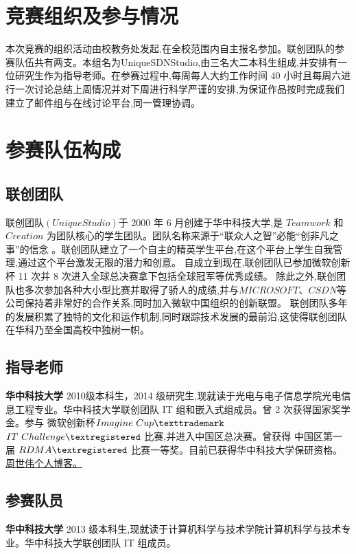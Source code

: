 \documentclass[format=draft,language=chinese,category=SDN]{hustreport}
\begin{document}
\section{竞赛组织及参与情况}
本次竞赛的组织活动由校教务处发起,在全校范围内自主报名参加。联创团队的参赛队伍共有两支。本组名为UniqueSDNStudio,由三名大二本科生组成,并安排有一位研究生作为指导老师。在参赛过程中,每周每人大约工作时间 40 小时且每周六进行一次讨论总结上周情况并对下周进行科学严谨的安排,为保证作品按时完成我们建立了邮件组与在线讨论平台,同一管理协调。
\section{参赛队伍构成}
\subsection{联创团队}
联创团队$(Unique Studio)$于 2000 年 6 月创建于华中科技大学,是 $Teamwork$ 和
 $Creation$ 为团队核心的学生团队。团队名称来源于“联众人之智”必能“创非凡之事”的信念
。联创团队建立了一个自主的精英学生平台,在这个平台上学生自我管理,通过这个平台激发无限的潜力和创意。
自成立到现在,联创团队已参加微软创新杯 11 次并 8 次进入全球总决赛拿下包括全球冠军等优秀成绩。
除此之外,联创团队也多次参加各种大小型比赛并取得了骄人的成绩,并与$MICROSOFT$\texttrademark、$CSDN$\texttrademark 等公司保持着非常好的合作关系,同时加入微软中国组织的创新联盟。
联创团队多年的发展积累了独特的文化和运作机制,同时跟踪技术发展的最前沿,这使得联创团队在华科乃至全国高校中独树一帜。
\subsection{指导老师}

\textbf{华中科技大学} 2010级本科生，2014 级研究生,现就读于光电与电子信息学院光电信息工程专业。华中科技大学联创团队 IT 组和嵌入式组成员。曾 2 次获得国家奖学金。参与 微软创新杯$Imagine~Cup\texttrademark$ $IT~Challenge\textregistered$ 比赛,并进入中国区总决赛。曾获得
中国区第一届 $RDMA\textregistered$ 比赛一等奖。目前已获得华中科技大学保研资格。
\href{http://zhoushiwei1992.blog.163.com}{周世伟个人博客。}
\subsection{参赛队员}

\textbf{华中科技大学} 2013 级本科生,现就读于计算机科学与技术学院计算机科学与技术专业。华中科技大学联创团队 IT 组成员。

\end{document}
